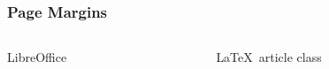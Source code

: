 \begin{frame}
\frametitle{Page Margins}
\begin{columns}
\begin{column}{0.5\textwidth}
\begin{center}
\vspace{-2em}
LibreOffice \medskip

\end{center}

\end{column}

\begin{column}{0.5\textwidth}
\begin{center}
\vspace{-2em}
\LaTeX\ article class \medskip


\end{center}
\end{column}
\end{columns}
\end{frame}
